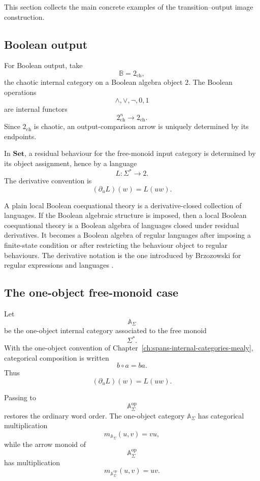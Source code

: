 This section collects the main concrete examples of the transition--output
image construction.

\subsection{Boolean output}
\label{subsec:to-boolean-output-example}

For Boolean output, take
\[
    \mathbb B=2_{\mathrm{ch}},
\]
the chaotic internal category on a Boolean algebra object \(2\). The Boolean
operations
\[
    \wedge,\vee,\neg,0,1
\]
are internal functors
\[
    2_{\mathrm{ch}}^n\to 2_{\mathrm{ch}}.
\]
Since \(2_{\mathrm{ch}}\) is chaotic, an output-comparison arrow is uniquely
determined by its endpoints.

In \(\mathbf{Set}\), a residual behaviour for the free-monoid input category
is determined by its object assignment, hence by a language
\[
    L:\Sigma^*\to 2.
\]
The derivative convention is
\[
    (\partial_uL)(w)=L(uw).
\]

A plain local Boolean coequational theory is a derivative-closed collection of
languages. If the Boolean algebraic structure is imposed, then a local Boolean
coequational theory is a Boolean algebra of languages closed under residual
derivatives. It becomes a Boolean algebra of regular languages after imposing a
finite-state condition or after restricting the behaviour object to regular
behaviours. The derivative notation is the one introduced by Brzozowski for
regular expressions and languages
\cite{Brzozowski1964}.

\subsection{The one-object free-monoid case}
\label{subsec:to-free-monoid-specialization}

Let
\[
    \mathbb A_\Sigma
\]
be the one-object internal category associated to the free monoid
\[
    \Sigma^*.
\]
With the one-object convention of
Chapter~\ref{ch:spans-internal-categories-mealy}, categorical composition is
written
\[
    b\circ a=ba.
\]
Thus
\[
    (\partial_uL)(w)=L(uw).
\]

Passing to
\[
    \mathbb A_\Sigma^{\mathrm{op}}
\]
restores the ordinary word order. The one-object category
\(\mathbb A_\Sigma\) has categorical multiplication
\[
    m_{\mathbb A_\Sigma}(u,v)=vu,
\]
while the arrow monoid of
\[
    \mathbb A_\Sigma^{\mathrm{op}}
\]
has multiplication
\[
    m_{\mathbb A_\Sigma^{\mathrm{op}}}(u,v)=uv.
\]

